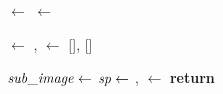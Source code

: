 \MakeRobust{\Call}

\begin{algorithmic}[0]
\label{alg:line:bodyregion} \State \body $\gets$ 
\label{alg:line:strokewidth} \State \strokewidth $\gets$  
\item[]
\label{alg:line:segmentationpoints} \State \segmentationpoints $\gets$  
\State \segmentfurther, \characters $\gets$ [\image], []
\item[]
\label{alg:line:whileCondition} 
	\label{alg:line:selectSubImage}\State $\mathit{sub\_image} \gets$  
	\label{alg:line:selectSegmentationPoint}\State $\mathit{sp} \gets$  
	\label{alg:line:split}\State \leftsubimage, \rightsubimage $\gets$ 
	\State {}
	\State {}
\EndWhile
\label{alg:line:merge}\State \textbf{return} 
\EndFunction
\end{algorithmic}